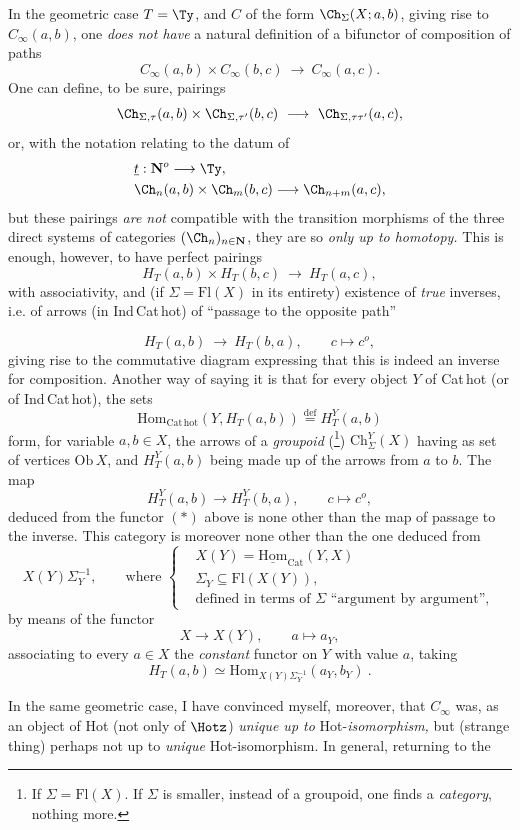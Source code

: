 In the geometric case $T = \Ty$, and $C$ of the form $\Ch_{\Sigma}(X;a,b)$, giving rise to $C_{\infty}(a,b)$, one \textit{does not have} a natural definition of a bifunctor of composition of paths
\[
C_{\infty}(a,b) \times C_{\infty}(b,c) \ \longrightarrow\ C_{\infty}(a,c).
\]
One can define, to be sure, pairings
\[
\Ch_{\Sigma,\tau}(a,b) \times \Ch_{\Sigma,\tau'}(b,c) \ \longrightarrow\ \Ch_{\Sigma,\tau\tau'}(a,c),
\]
or, with the notation relating to the datum of
\[
\begin{aligned}
&\underline{t} : \mathbf{N}^{o} \longrightarrow \Ty,\\
&\Ch_{n}(a,b) \times \Ch_{m}(b,c) \longrightarrow \Ch_{n+m}(a,c),
\end{aligned}
\]
but these pairings \textit{are not} compatible with the transition morphisms of the three direct systems of categories $(\Ch_{n})_{n\in\mathbf{N}}$, they are so \textit{only up to homotopy.} This is enough, however, to have perfect pairings
\[
H_{T}(a,b) \times H_{T}(b,c) \ \longrightarrow\ H_{T}(a,c),
\]
with associativity, and (if $\Sigma = \mathrm{Fl}(X)$ in its entirety) existence of \textit{true} inverses, i.e. of arrows (in Ind\,Cat\,hot) of ``passage to the opposite path''

\[
H_{T}(a,b) \ \longrightarrow\ H_{T}(b,a), \qquad c \longmapsto c^{o}, \tag*{$(*)$}
\]
giving rise to the commutative diagram expressing that this is indeed an inverse for composition. Another way of saying it is that for every object $Y$ of Cat\,hot (or of Ind\,Cat\,hot), the sets
\[
\mathrm{Hom}_{\mathrm{Cat\,hot}}(Y, H_{T}(a,b)) \overset{\text{def}}{=} H_{T}^{Y}(a,b)
\]
form, for variable $a,b \in X$, the arrows of a \textit{groupoid} (\footnote[25]{If $\Sigma = \mathrm{Fl}(X)$. If $\Sigma$ is smaller, instead of a groupoid, one finds a \textit{category}, nothing more.}) $\mathrm{Ch}_{\Sigma}^{Y}(X)$ having as set of vertices $\mathrm{Ob}\,X$, and $H_{T}^{Y}(a,b)$ being made up of the arrows from $a$ to $b$. The map
\[
H_{T}^{Y}(a,b) \longrightarrow H_{T}^{Y}(b,a), \qquad c \longmapsto c^{o},
\]
deduced from the functor $(*)$ above is none other than the map of passage to the inverse. This category is moreover none other than the one deduced from %
\[
X(Y)\Sigma_{Y}^{-1}, \qquad \text{where } \left\{
\begin{aligned}
&X(Y) = \underline{\mathrm{Hom}}_{\mathrm{Cat}}(Y,X)\\
&\Sigma_{Y} \subseteq \mathrm{Fl}(X(Y)),\\
&\text{defined in terms of } \Sigma \text{ ``argument by argument''},
\end{aligned}
\right.
\]
by means of the functor
\[
X \longrightarrow X(Y), \qquad a \longmapsto a_{Y},
\]
associating to every $a \in X$ the \textit{constant} functor on $Y$ with value $a$, taking
\[
H_{T}(a,b) \simeq \mathrm{Hom}_{X(Y)\Sigma_{Y}^{-1}}(a_{Y}, b_{Y}) \ .
\]

In the same geometric case, I have convinced myself, moreover, that $C_{\infty}$ was, as an object of Hot (not only of $\Hotz$) \textit{unique up to} Hot-\textit{isomorphism,} but (strange thing) perhaps not up to \textit{unique} Hot-isomorphism. In general, returning to the
